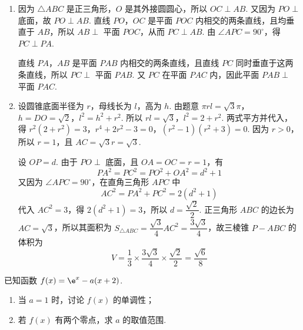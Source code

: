 \begin{solution}
\begin{enumerate}
\item 因为 \(\triangle ABC\) 是正三角形，\(O\) 是其外接圆圆心，所以 \(OC\perp AB\). 又因为 \(PO\perp\) 底面，故 \(PO\perp AB\). 直线 \(PO\)，\(OC\) 是平面 \(POC\) 内相交的两条直线，且均垂直于 \(AB\)，所以 \(AB\perp\) 平面 \(POC\)，从而
\(PC\perp AB\). 由 \(\angle APC=90^{\circ}\)，得 \(PC\perp PA\).

直线 \(PA\)，\(AB\) 是平面 \(PAB\) 内相交的两条直线，且直线 \(PC\) 同时垂直于这两条直线，所以 \(PC\perp\) 平面 \(PAB\). 又 \(PC\) 在平面 \(PAC\) 内，因此平面 \(PAB\perp\) 平面 \(PAC\).

\item 设圆锥底面半径为 \(r\)，母线长为 \(l\)，高为 \(h\). 由题意
\(\pi rl=\sqrt{3}\pi\)，\(h=DO=\sqrt{2}\)，\(l^2=h^2+r^2\).
所以 \(rl=\sqrt{3}\)，\(l^2=2+r^2\). 两式平方并代入，得
\(r^2(2+r^2)=3\)，\(r^4+2r^2-3=0\)，\((r^2-1)(r^2+3)=0\).
因为 \(r>0\)，所以 \(r=1\)，且 \(AC=\sqrt{3}r=\sqrt{3}\).

设 \(OP=d\). 由于 \(PO\perp\) 底面，且 \(OA=OC=r=1\)，有
\[
PA^2=PC^2=PO^2+OA^2=d^2+1
\]
又因为 \(\angle APC=90^{\circ}\)，在直角三角形 \(APC\) 中
\[
AC^2=PA^2+PC^2=2(d^2+1)
\]
代入 \(AC^2=3\)，得 \(2(d^2+1)=3\)，所以 \(d=\dfrac{\sqrt{2}}2\).
正三角形 \(ABC\) 的边长为 \(AC=\sqrt{3}\)，所以其面积为
\(S_{\triangle ABC}=\dfrac{\sqrt{3}}4AC^2=\dfrac{3\sqrt{3}}4\)，故三棱锥 \(P-ABC\) 的体积为
\[
V=\dfrac13\times\dfrac{3\sqrt{3}}4\times\dfrac{\sqrt{2}}2=\dfrac{\sqrt{6}}8
\]
\end{enumerate}
\end{solution}

\begin{problem}
已知函数 \(f(x)=\e^x-a(x+2)\).

\begin{enumerate}
\item 当 \(a=1\) 时，讨论 \(f(x)\) 的单调性；

\item 若 \(f(x)\) 有两个零点，求 \(a\) 的取值范围.
\end{enumerate}
\end{problem}

